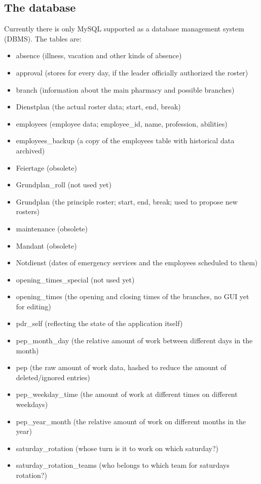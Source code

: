 \subsection{The database}
Currently there is only MySQL supported as a database management system (DBMS).
The tables are:
\begin{itemize}
\item absence (illness, vacation and other kinds of absence)
\item approval (stores for every day, if the leader officially authorized the roster)
\item branch (information about the main pharmacy and possible branches)
\item Dienstplan (the actual roster data; start, end, break)
\item employees (employee data; employee\_id, name, profession, abilities)
\item employees\_backup (a copy of the employees table with historical data archived)
\item Feiertage (obsolete)
\item Grundplan\_roll (not used yet)
\item Grundplan (the principle roster; start, end, break; used to propose new rosters)
\item maintenance (obsolete)
\item Mandant (obsolete)
\item Notdienst (dates of emergency services and the employees scheduled to them)
\item opening\_times\_special (not used yet)
\item opening\_times (the opening and closing times of the branches, no GUI yet for editing)
\item pdr\_self (reflecting the state of the application itself)
\item pep\_month\_day (the relative amount of work between different days in the month)
\item pep (the raw amount of work data, hashed to reduce the amount of deleted/ignored entries)
\item pep\_weekday\_time (the amount of work at different times on different weekdays)
\item pep\_year\_month (the relative amount of work on different months in the year)
\item saturday\_rotation (whose turn is it to work on which saturday?)
\item saturday\_rotation\_teams (who belongs to which team for saturdays rotation?)

\end{itemize}
